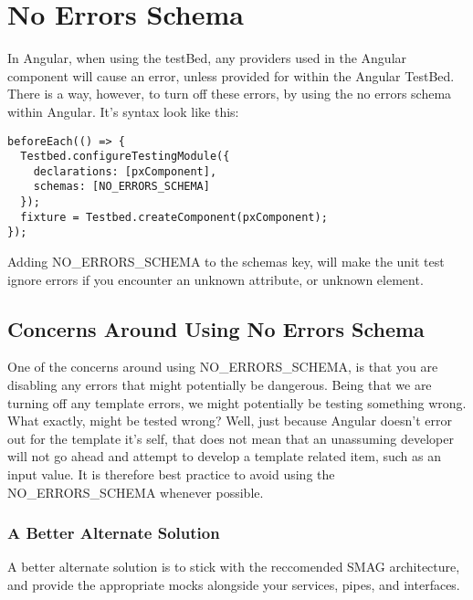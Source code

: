 \maketitle{}
\section{ No Errors Schema }

In Angular, when using the testBed, any providers used in the Angular component
will cause an error, unless provided for within the Angular TestBed. There is a
way, however, to turn off these errors, by using the no errors schema within
Angular. It's syntax look like this:
\begin{lstlisting}
beforeEach(() => {
  Testbed.configureTestingModule({
    declarations: [pxComponent],
    schemas: [NO_ERRORS_SCHEMA]
  });
  fixture = Testbed.createComponent(pxComponent);
});
\end{lstlisting}

Adding NO_ERRORS_SCHEMA to the schemas key, will make the unit test ignore
errors if you encounter an unknown attribute, or unknown element.

\subsection{ Concerns Around Using No Errors Schema }
One of the concerns around using NO_ERRORS_SCHEMA, is that you are disabling
any errors that might potentially be dangerous. Being that we are turning off
any template errors, we might potentially be testing something wrong. What
exactly, might be tested wrong? Well, just because Angular doesn't error out
for the template it's self, that does not mean that an unassuming developer
will not go ahead and attempt to develop a template related item, such as an
input value. It is therefore best practice to avoid using the NO_ERRORS_SCHEMA
whenever possible.

\subsubsection{A Better Alternate Solution}
A better alternate solution is to stick with the reccomended SMAG architecture,
and provide the appropriate mocks alongside your services, pipes, and
interfaces. 
